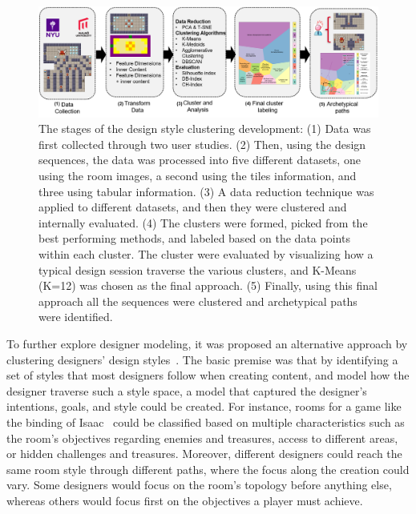 
\begin{figure}
\centerline{\includegraphics[width=\textwidth]{figures/DesPersonas-figs/process-steps.png}}
\caption{The stages of the design style clustering development: (1) Data was first collected through two user studies. (2) Then, using the design sequences, the data was processed into five different datasets, one using the room images, a second using the tiles information, and three using tabular information. (3) A data reduction technique was applied to different datasets, and then they were clustered and internally evaluated. (4) The clusters were formed, picked from the best performing methods, and labeled based on the data points within each cluster. The cluster were evaluated by visualizing how a typical design session traverse the various clusters, and K-Means (K=12) was chosen as the final approach. (5) Finally, using this final approach all the sequences were clustered and archetypical paths were identified.
} \label{fig:clusteringApproach}
\end{figure}

To further explore designer modeling, it was proposed an alternative approach by clustering designers' design styles~\cite{alvarez2020-designerpersonas}. The basic premise was that by identifying a set of styles that most designers follow when creating content, and model how the designer traverse such a style space, a model that captured the designer's intentions, goals, and style could be created. For instance, rooms for a game like the binding of Isaac~\cite{bindingISAAC} could be classified based on multiple characteristics such as the room's objectives regarding enemies and treasures, access to different areas, or hidden challenges and treasures. Moreover, different designers could reach the same room style through different paths, where the focus along the creation could vary. Some designers would focus on the room's topology before anything else, whereas others would focus first on the objectives a player must achieve. 


